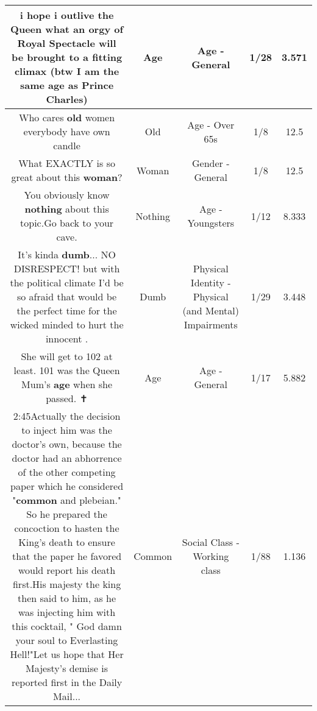 \documentclass[11pt]{article}
\newlength\mylength
\begin{document}
\begin{center}
\begin{longtable}{|C{.65\mylength}|C{.30\mylength}|C{.12\mylength}|C{.12\mylength}|C{.12\mylength}|}
  \small i hope i outlive the Queen    what an orgy of Royal Spectacle will be brought to a fitting climax   (btw   I am the same \textbf{age} as Prince Charles)\normalsize   & Age & Age - General & 1/28 & 3.571 \\  \hline
  \small Who cares \textbf{old} women  everybody  have own candle\normalsize   & Old & Age - Over 65s & 1/8 & 12.5 \\  \hline
  \small What EXACTLY is so great about this \textbf{woman}?\normalsize   & Woman & Gender - General & 1/8 & 12.5 \\  \hline
  \small You obviously know \textbf{nothing} about this topic.Go back to your cave.\normalsize   & Nothing & Age - Youngsters & 1/12 & 8.333 \\  \hline
  \small It's kinda \textbf{dumb}... NO DISRESPECT! but with the political climate I'd be so afraid that would be the perfect time for the wicked minded to hurt the innocent .\normalsize   & Dumb & Physical Identity - Physical (and Mental) Impairments & 1/29 & 3.448 \\  \hline
  \small She will get to 102 at least.  101 was the Queen Mum's \textbf{age} when she passed. ✝\normalsize   & Age & Age - General & 1/17 & 5.882 \\  \hline
  \small 2:45Actually the decision to inject him was the doctor's own, because the doctor had an abhorrence of the other competing paper which he considered "\textbf{common} and plebeian."  So he prepared the concoction to hasten the King's death to ensure that the paper he favored would report his death first.His majesty the king then said to him, as he was injecting him with this cocktail, " God damn your soul to Everlasting Hell!"Let us hope that Her Majesty's demise is reported first in the Daily Mail...\normalsize   & Common & Social Class - Working class & 1/88 & 1.136 \\  \hline

\end{longtable}
\end{center}
\end{document}
